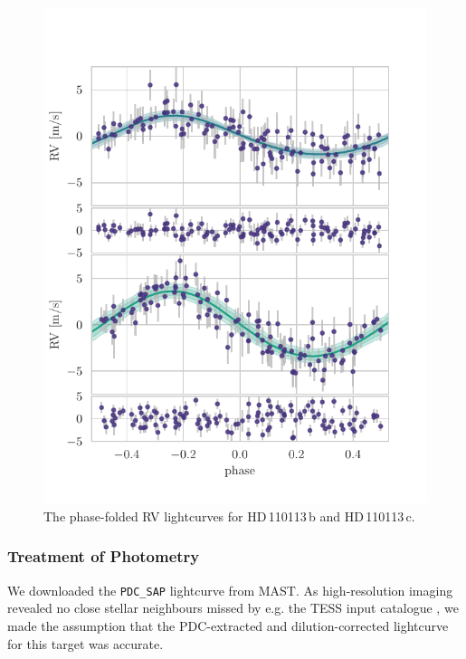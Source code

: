 \documentclass[fleqn,usenatbib]{mnras}
\newcommand{\Tplanet}{HD\,110113\,b}
\newcommand{\Tplanetc}{HD\,110113\,c}
\begin{document}
\begin{figure}
	\includegraphics[width=\columnwidth, trim={0.1cm 0.8cm 1.0cm 0.85cm}]{Phase_folded_RV_plots_3_GPs_nontransiting_c.pdf}
    \caption{The phase-folded RV lightcurves for \Tplanet{} and \Tplanetc{}.}
    \label{fig:phase_fold_rvs}
\end{figure}

\subsubsection{Treatment of Photometry}
We downloaded the \texttt{PDC\_SAP} lightcurve from MAST.
As high-resolution imaging revealed no close stellar neighbours missed by e.g. the TESS input catalogue \citep{stassun2019revised}, we made the assumption that the PDC-extracted and dilution-corrected lightcurve for this target was accurate.
\end{document}

